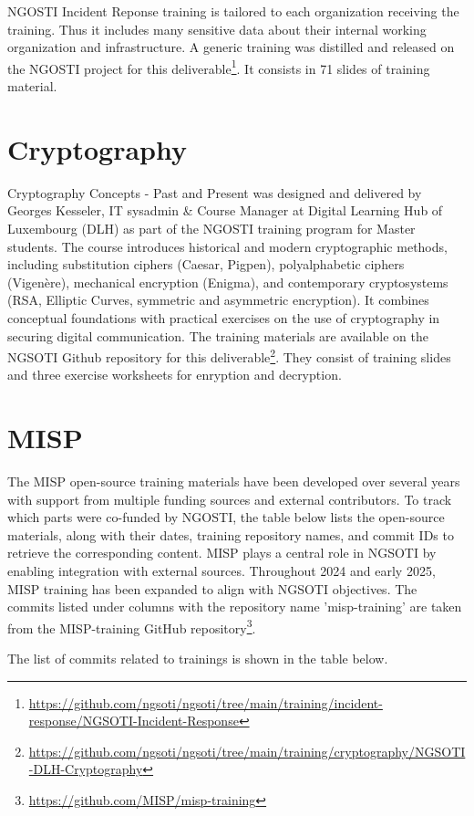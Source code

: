 \documentclass[10pt,a4paper]{report}
\begin{document}
NGOSTI Incident Reponse training is tailored to each organization receiving the
training. Thus it includes many sensitive data about their internal working
organization and infrastructure.
A generic training was distilled and released on the NGOSTI project for this
deliverable\footnote{\url{https://github.com/ngsoti/ngsoti/tree/main/training/incident-response/NGSOTI-Incident-Response}}.
It consists in 71 slides of training material.

\section{Cryptography}

Cryptography Concepts - Past and Present was designed and delivered by Georges Kesseler, IT sysadmin \& Course Manager at Digital Learning Hub of Luxembourg (DLH) as part of the NGOSTI training program for Master students. The course introduces historical and modern cryptographic methods, including substitution ciphers (Caesar, Pigpen), polyalphabetic ciphers (Vigenère), mechanical encryption (Enigma), and contemporary cryptosystems (RSA, Elliptic Curves, symmetric and asymmetric encryption). It combines conceptual foundations with practical exercises on the use of cryptography in securing digital communication. The training materials are available on the NGSOTI Github repository for this deliverable\footnote{\url{https://github.com/ngsoti/ngsoti/tree/main/training/cryptography/NGSOTI-DLH-Cryptography}}. They consist of training slides and three exercise worksheets for enryption and decryption.

\section{MISP}
The MISP open-source training materials have been developed over several years
with support from multiple funding sources and external contributors. To track
which parts were co-funded by NGOSTI, the table below lists the open-source
materials, along with their dates, training repository names, and commit IDs
to retrieve the corresponding content.
MISP plays a central role in NGSOTI by enabling integration with external
sources. Throughout 2024 and early 2025, MISP training has been expanded to
align with NGSOTI objectives. The commits listed under columns with the
repository name 'misp-training' are taken from the MISP-training GitHub
repository\footnote{\url{https://github.com/MISP/misp-training}}.


The list of commits related to trainings is shown in the table below.
\end{document}
